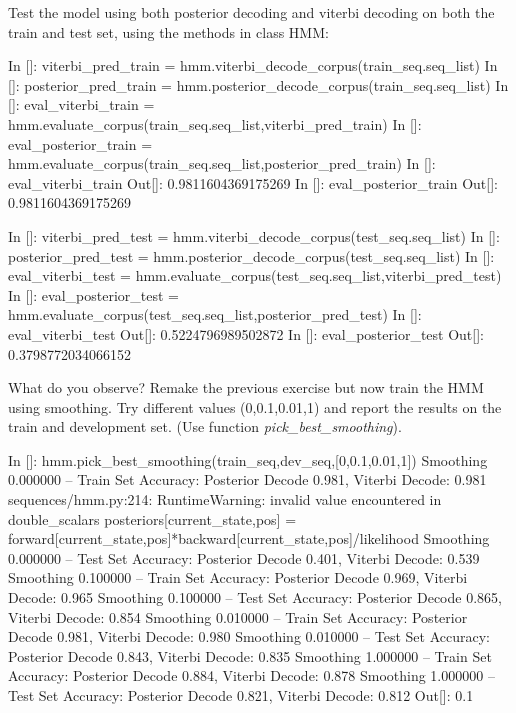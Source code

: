 \begin{exercise}
Test the model using both posterior decoding and viterbi decoding on
both the train and test set, using the methods in class HMM:
\begin{python}
In []: viterbi_pred_train = hmm.viterbi_decode_corpus(train_seq.seq_list)
In []: posterior_pred_train = hmm.posterior_decode_corpus(train_seq.seq_list)
In []: eval_viterbi_train =   hmm.evaluate_corpus(train_seq.seq_list,viterbi_pred_train)
In []: eval_posterior_train = hmm.evaluate_corpus(train_seq.seq_list,posterior_pred_train)
In []: eval_viterbi_train
Out[]: 0.9811604369175269
In []: eval_posterior_train
Out[]: 0.9811604369175269

In []: viterbi_pred_test = hmm.viterbi_decode_corpus(test_seq.seq_list)
In []: posterior_pred_test = hmm.posterior_decode_corpus(test_seq.seq_list)
In []: eval_viterbi_test =   hmm.evaluate_corpus(test_seq.seq_list,viterbi_pred_test)
In []: eval_posterior_test = hmm.evaluate_corpus(test_seq.seq_list,posterior_pred_test)
In []: eval_viterbi_test
Out[]: 0.5224796989502872
In []: eval_posterior_test
Out[]: 0.3798772034066152


\end{python}

What do you observe? Remake the previous exercise but now train the HMM
using smoothing. Try different values (0,0.1,0.01,1) and report the results on the
train and development set. (Use function
\emph{pick\_best\_smoothing}).


\begin{python}
In []: hmm.pick_best_smoothing(train_seq,dev_seq,[0,0.1,0.01,1])
Smoothing 0.000000 --  Train Set Accuracy: Posterior Decode 0.981, Viterbi Decode: 0.981
sequences/hmm.py:214: RuntimeWarning: invalid value encountered in double_scalars
  posteriors[current_state,pos] = forward[current_state,pos]*backward[current_state,pos]/likelihood
Smoothing 0.000000 -- Test Set Accuracy: Posterior Decode 0.401, Viterbi Decode: 0.539
Smoothing 0.100000 --  Train Set Accuracy: Posterior Decode 0.969, Viterbi Decode: 0.965
Smoothing 0.100000 -- Test Set Accuracy: Posterior Decode 0.865, Viterbi Decode: 0.854
Smoothing 0.010000 --  Train Set Accuracy: Posterior Decode 0.981, Viterbi Decode: 0.980
Smoothing 0.010000 -- Test Set Accuracy: Posterior Decode 0.843, Viterbi Decode: 0.835
Smoothing 1.000000 --  Train Set Accuracy: Posterior Decode 0.884, Viterbi Decode: 0.878
Smoothing 1.000000 -- Test Set Accuracy: Posterior Decode 0.821, Viterbi Decode: 0.812
Out[]: 0.1
\end{python}


\end{exercise}
